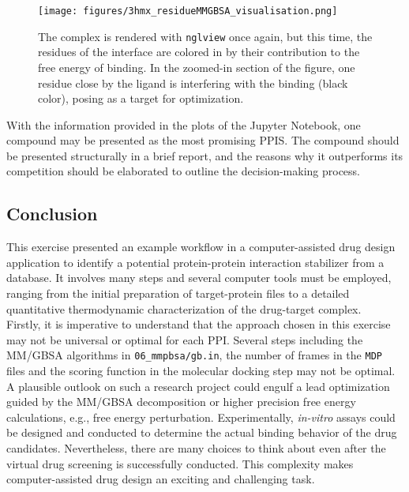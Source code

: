 \documentclass[9pt,tutorial]{livecoms}
\newcommand{\code}[1]{\colorbox{light-gray}{\texttt{#1}}}
\begin{document}
\begin{figure}[H]
    \centering
    \texttt{[image: figures/3hmx\_residueMMGBSA\_visualisation.png]}
    \caption{The complex is rendered with \code{nglview} once again, but this time, the residues of the interface are colored in by their contribution to the free energy of binding. In the zoomed-in section of the figure, one residue close by the ligand is interfering with the binding (black color), posing as a target for optimization.}
    \label{fig:3hmx_residueMMGBSA_visualisation}
\end{figure}
With the information provided in the plots of the Jupyter Notebook, one compound may be presented as the most promising PPIS. The compound should be presented structurally in a brief report, and the reasons why it outperforms its competition should be elaborated to outline the decision-making process.


\subsection*{Conclusion}
This exercise presented an example workflow in a computer-assisted drug design application to identify a potential protein-protein interaction stabilizer from a database.
It involves many steps and several computer tools must be employed, ranging from the initial preparation of target-protein files to a detailed quantitative thermodynamic characterization of the drug-target complex.\\
Firstly, it is imperative to understand that the approach chosen in this exercise may not be universal or optimal for each PPI. Several steps including the MM/GBSA algorithms in \code{06\_mmpbsa/gb.in}, the number of frames in the \texttt{MDP} files and the scoring function in the molecular docking step may not be optimal.\\
A plausible outlook on such a research project could engulf a lead optimization guided by the MM/GBSA decomposition or higher precision free energy calculations, e.g., free energy perturbation. Experimentally, \textit{in-vitro} assays could be designed and conducted to determine the actual binding behavior of the drug candidates. Nevertheless, there are many choices to think about even after the virtual drug screening is successfully conducted. This complexity makes computer-assisted drug design an exciting and challenging task.
\end{document}
